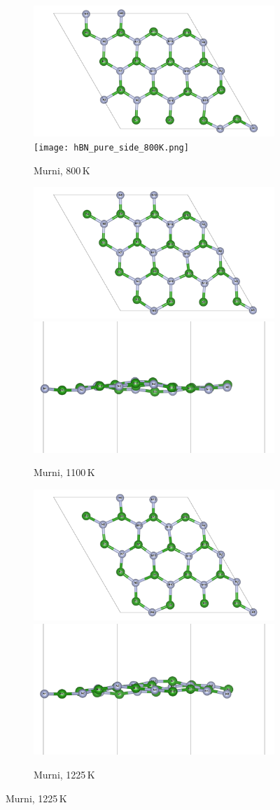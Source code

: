 \begin{figure}[htbp]
  \centering
  \begin{subfigure}{\textwidth}
    \centering
    \includegraphics[width=0.49\linewidth]{gambar_hasil/hBN_pure_800K.png}\hfill
    \texttt{[image: hBN\_pure\_side\_800K.png]}
    \caption{Murni, 800 K}
    \label{subfig:md_pure_800k}
  \end{subfigure}
  \vspace{1em}
  \begin{subfigure}{\textwidth}
    \centering
    \includegraphics[width=0.49\linewidth]{gambar_hasil/hBN_pure_1100K.png}\hfill
    \includegraphics[width=0.49\linewidth]{gambar_hasil/hBN_pure_side_1100K.png}
    \caption{Murni, 1100 K}
    \label{subfig:md_pure_1100k}
  \end{subfigure}
  \vspace{1em}
  \begin{subfigure}{\textwidth}
    \centering
    \includegraphics[width=0.49\linewidth]{gambar_hasil/hBN_pure_1225K.png}\hfill
    \includegraphics[width=0.49\linewidth]{gambar_hasil/hBN_pure_side_1225K.png}
    \caption{Murni, 1225 K}
    \label{subfig:md_pure_1225k}
  \end{subfigure}
\end{figure}

